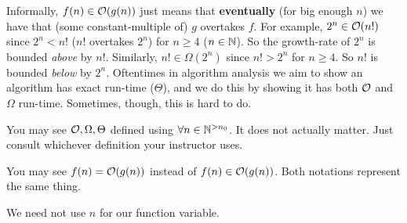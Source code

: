 \documentclass[main.tex]{subfiles}
\begin{document}
Informally, \(f(n) \in \mathcal{O}(g(n))\) just means that \textbf{eventually} (for big enough \(n\)) we have that (some constant-multiple of) \(g\) overtakes \(f\).
For example, \(2^n \in \mathcal{O}(n!)\) since \(2^n < n!\) (\(n!\) overtakes \(2^n\)) for \(n \geq 4\) (\(n \in \mathbb{N}\)).
So the growth-rate of \(2^n\) is bounded \textit{above} by \(n!\).
Similarly, \(n! \in \Omega(2^n)\) since \(n! > 2^n\) for \(n \geq 4\).
So \(n!\) is bounded \textit{below} by \(2^n\).
Oftentimes in algorithm analysis we aim to show an algorithm has exact run-time (\(\Theta\)), and we do this by showing it has both \(\mathcal{O}\) and \(\Omega\) run-time.
Sometimes, though, this is hard to do.

\begin{rem}
	You may see \(\mathcal{O},\Omega,\Theta\) defined using \(\forall n \in \mathbb{N}^{> n_0}\).
	It does not actually matter.
	Just consult whichever definition your instructor uses.
\end{rem}

\begin{rem}
	You may see \(f(n) = \mathcal{O}(g(n))\) instead of \(f(n) \in \mathcal{O}(g(n))\).
	Both notations represent the same thing.
\end{rem}

\begin{rem}
	We need not use \(n\) for our function variable.
\end{rem}


\end{document}
